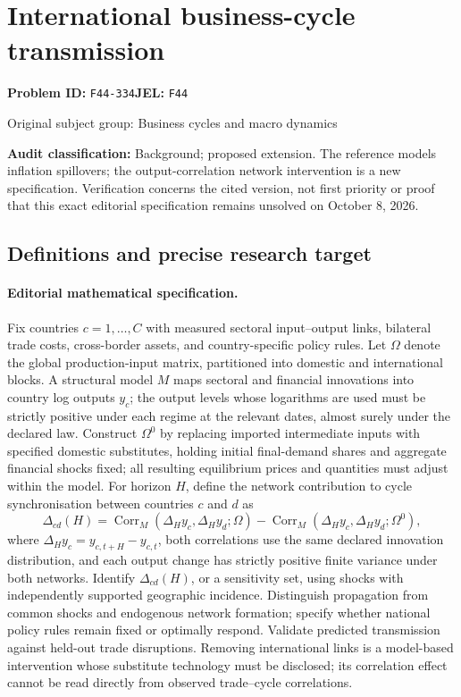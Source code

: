 \documentclass[11pt,a4paper]{article}
\begin{document}
\section*{International business-cycle transmission}
\textbf{Problem ID:} \texttt{F44-334}\quad \textbf{JEL:} \texttt{F44}\par
\label{problem:OP-0238}
\label{audited:ECON-083}
{\sffamily\small\color{muted}Original subject group: Business cycles and macro dynamics\par}
\label{definitions:problem:30007519}
\textbf{Audit classification:} Background; proposed extension. The reference models inflation spillovers; the output-correlation network intervention is a new specification. Verification concerns the cited version, not first priority or proof that this exact editorial specification remains unsolved on October 8, 2026.
\subsection*{Definitions and precise research target}
\paragraph{Editorial mathematical specification.} Fix countries \(c=1,\ldots,C\) with measured sectoral input–output links, bilateral trade costs, cross-border assets, and country-specific policy rules. Let \(\Omega\) denote the global production-input matrix, partitioned into domestic and international blocks. A structural model \(M\) maps sectoral and financial innovations into country log outputs \(y_c\); the output levels whose logarithms are used must be strictly positive under each regime at the relevant dates, almost surely under the declared law. Construct \(\Omega^0\) by replacing imported intermediate inputs with specified domestic substitutes, holding initial final-demand shares and aggregate financial shocks fixed; all resulting equilibrium prices and quantities must adjust within the model.
For horizon \(H\), define the network contribution to cycle synchronisation between countries \(c\) and \(d\) as
\[
\Delta_{cd}(H)=\operatorname{Corr}_M(\Delta_H y_c,\Delta_H y_d;\Omega)
-\operatorname{Corr}_M(\Delta_H y_c,\Delta_H y_d;\Omega^0),
\]
where \(\Delta_H y_c=y_{c,t+H}-y_{c,t}\), both correlations use the same declared innovation distribution, and each output change has strictly positive finite variance under both networks. Identify \(\Delta_{cd}(H)\), or a sensitivity set, using shocks with independently supported geographic incidence. Distinguish propagation from common shocks and endogenous network formation; specify whether national policy rules remain fixed or optimally respond. Validate predicted transmission against held-out trade disruptions. Removing international links is a model-based intervention whose substitute technology must be disclosed; its correlation effect cannot be read directly from observed trade–cycle correlations.
\end{document}
